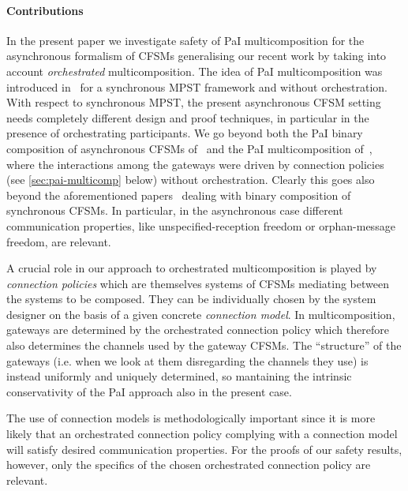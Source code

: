 \noindent
\paragraph{Contributions}
 In the present paper we investigate safety of PaI multicomposition for the asynchronous formalism of CFSMs generalising  our recent work 
 \cite{BH24} by taking into account {\em orchestrated} multicomposition.
The idea of PaI multicomposition was introduced in~\cite{BDGY23} for a synchronous MPST framework
and without orchestration. 
With respect to synchronous MPST, the present asynchronous CFSM setting needs completely different design and proof techniques, in
particular in the presence of orchestrating participants. 
We go beyond both the PaI binary composition of asynchronous CFSMs of~\cite{BdLH19}
and the PaI multicomposition of~\cite{BH24}, where the interactions among the gateways were 
driven by connection policies (see \cref{sec:pai-multicomp} below) without orchestration.
Clearly this goes also beyond the aforementioned papers~\cite{BLT20,BLP22b,BLT23} dealing with binary composition of synchronous CFSMs. In particular, in the asynchronous case different communication properties, like unspecified-reception freedom or orphan-message freedom, are relevant. 

A crucial role in our approach to orchestrated multicomposition is played by
{\em connection policies} which are themselves systems of CFSMs mediating between the systems to be composed. They can be individually chosen 
by the system designer on the basis of a given concrete  \emph{connection model}.
In multicomposition, gateways are determined by the orchestrated connection policy 
which therefore also determines the channels used by the gateway CFSMs.
The ``structure'' of the gateways (i.e. when we look at them disregarding the channels they use)
is instead uniformly and uniquely determined,
so mantaining the intrinsic conservativity of the PaI approach also in the present case.

The use of connection models  is methodologically important 
since it is more likely that an orchestrated connection policy complying with a connection model will satisfy desired communication properties.
For the proofs of our safety results, however, only the specifics of the chosen orchestrated connection policy are relevant.

